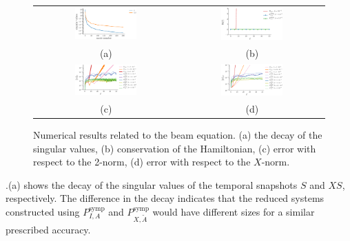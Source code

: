 \begin{figure}[t] 
\begin{tabular}{cc}
\includegraphics[width=0.45\textwidth]{./images/paper2/beam/singulars} & \includegraphics[width=0.45\textwidth]{./images/paper2/beam/energy} \\
(a) & (b) \\
\includegraphics[width=0.45\textwidth]{./images/paper2/beam/l2_norm} & \includegraphics[width=0.45\textwidth]{./images/paper2/beam/energy_norm} \\
(c) & (d) \\
\end{tabular}
\caption{Numerical results related to the beam equation. (a) the decay of the singular values, (b) conservation of the Hamiltonian, (c) error with respect to the 2-norm, (d) error with respect to the $X$-norm.} \label{fig:1}
\end{figure}

.(a) shows the decay of the singular values of the temporal snapshots $S$ and $XS$, respectively. The difference in the decay indicates that the reduced systems constructed using $P_{I,A}^{\text{symp}}$ and $P_{X,\tilde A}^{\text{symp}}$ would have different sizes for a similar prescribed accuracy.

